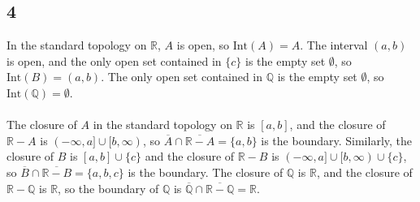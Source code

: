 \documentclass{article}
\begin{document}
\subsection*{4}
In the standard topology on $\mathbb{R}$, $A$ is open, so $\mathrm{Int}(A) = A$.  
The interval $(a, b)$ is open, and the only open set contained in $\{c\}$ is 
the empty set $\emptyset$, so $\mathrm{Int}(B) = (a, b)$.  The only open set contained 
in $\mathbb{Q}$ is the empty set $\emptyset$, so $\mathrm{Int}(\mathbb{Q}) = \emptyset$. \\ 
\\ 
The closure of $A$ in the standard topology on $\mathbb{R}$ is $[a, b]$, and the closure of $\mathbb{R} - A$ is $(-\infty, a] \cup [b, \infty)$, 
so $\overline{A} \cap \overline{\mathbb{R}-A} = \{a, b\}$ is the boundary.  Similarly, the closure of $B$ is $[a, b] \cup \{c\}$ and 
the closure of $\mathbb{R} - B$ is $(-\infty, a] \cup [b, \infty) \cup \{c\}$, so 
$\overline{B} \cap \overline{\mathbb{R}-B} = \{a, b, c\}$ is the boundary.  The closure of 
$\mathbb{Q}$ is $\mathbb{R}$, and the closure of $\mathbb{R} - \mathbb{Q}$ is 
$\mathbb{R}$, so the boundary of $\mathbb{Q}$ is $\overline{\mathbb{Q}} \cap \overline{\mathbb{R} - \mathbb{Q}} = \mathbb{R}$. 
\end{document}
